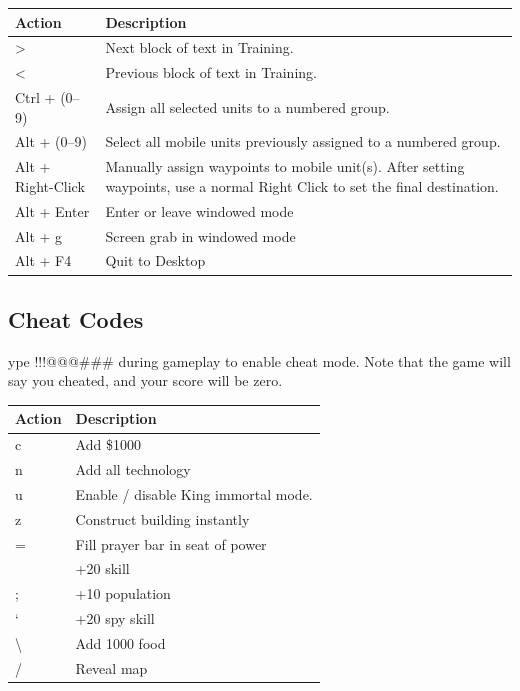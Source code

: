 \begin{center}
	\begin{tabular}{|p{1in}|p{3in}|}
		\hline	 	
		Action	& Description \\ \hline
		\textgreater & Next block of text in Training. \\ \hline
		\textless	& Previous block of text in Training. \\ \hline
		Ctrl + (0--9)	& Assign all selected units to a numbered group. \\ \hline
		Alt + (0--9)	& Select all mobile units previously assigned to a numbered group. \\ \hline
		Alt + Right-Click	& Manually assign waypoints to mobile unit(s). After setting waypoints, use a normal Right Click to set the final destination. \\ \hline
		Alt + Enter & Enter or leave windowed mode \\ \hline
		Alt + g & Screen grab in windowed mode \\ \hline
		Alt + F4	& Quit to Desktop \\ \hline
	\end{tabular}
\end{center}

\subsection{Cheat Codes}


ype !!!@@@\#\#\# during gameplay to enable cheat mode. Note that the game will say you cheated, and your score will be zero.

\begin{center}
	\begin{tabular}{|p{1in}|p{3in}|}
		\hline	 
		Action	& Description \\ \hline
		c	& Add \$1000 \\ \hline
		n	& Add all technology \\ \hline
		u	& Enable / disable King immortal mode. \\ \hline
		z	& Construct building instantly \\ \hline
		=	& Fill prayer bar in seat of power \\ \hline
		[	& +20 combat skill \\ \hline
		]	& +20 skill \\ \hline
		;	& +10 population \\ \hline
		‘	& +20 spy skill \\ \hline
		\textbackslash & Add 1000 food \\ \hline
		/	& Reveal map \\ \hline
	\end{tabular}
\end{center}
